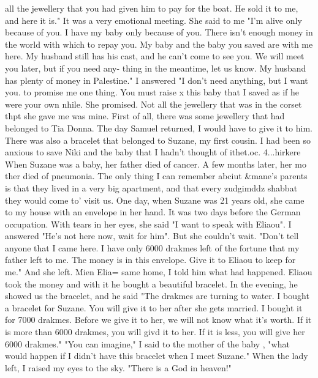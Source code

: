 all the jewellery that you had given him to pay for the boat. He sold it to me, and 
here it is." It was a very emotional meeting. She said to me "I'm alive only because 
of you. I have my baby only because of you. There isn't enough money in the world with 
which to repay you. My baby and the baby you saved are with me here. My husband still 
has his cast, and he can't come to see you. We will meet you later, but if you need any-
thing in the meantime, let us know. My husband has plenty of money in Palestine." I 
answered "I don't need anything, but I want you. to promise me one thing. You must raise 
x this baby that I saved as if he were your own nhile. She promised. 
Not all the jewellery that was in the corset thpt she gave me was mine. First of all, 
there was some jewellery that had belonged to Tia Donna. The day Samuel returned, I 
would have to give it to him. There was also a bracelet that belonged to Suzane, my first 
cousin. I had been so anxious to save Niki and the baby that I hadn't thought of 
ithet.oc. 4...hirkere 
When Suzane was a baby, her father died of cancer. A few months later, her mo
ther died of pneumonia. The only thing I can remember abciut &mane's parents is that 
they lived in a very big apartment, and that every zudgimddz shabbat they would come to' 
visit us. One day, when Suzane was 21 years old, she came to my house with an envelope 
in her hand. It was two days before the German occupation. With tears in her eyes, she 
said "I want to speak with Eliaou". I answered "He's not here now, wait for him". 
But she couldn't wait. "Don't tell anyone that I came here. I have only 6000 drakmes 
left of the fortune that my father left to me. The money is in this envelope. Give it 
to Eliaou to keep for me." And she left. 
Mien Elia= same home, I told him what had happened. Eliaou took the money and 
with it he bought a beautiful bracelet. In the evening, he showed us the bracelet, and 
he said "The drakmes are turning to water. I bought a bracelet for Suzane. You will 
give it to her after she gets married. I bought it for 7000 drakmes. Before we give 
it to her, we will not know what it's worth. If it is more than 6000 drakmes, you will 
givd it to her. If it is less, you will give her 6000 drakmes." 
"You can imagine," I said to the mother of the baby , "what would happen if I 
didn't have this bracelet when I meet Suzane." When the lady left, I raised my eyes 
to the sky. "There is a God in heaven!" 
